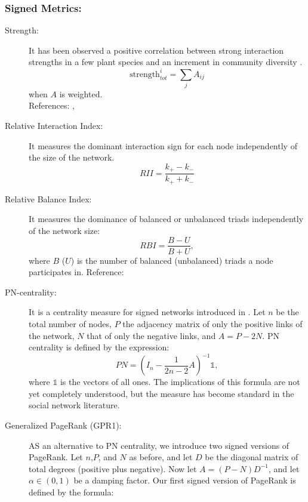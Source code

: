 \subsubsection{Signed Metrics:}
   \begin{description}
       
\item[Strength:] 
It has been observed a positive correlation between strong interaction strengths in a few plant species and an increment in community diversity \cite{melian2009diversity}.
\begin{equation}
       \textrm{strength}^{i}_{tot} = \sum_j A_{ij}
\end{equation}
 when $A$ is weighted.  \\
   References: \cite{Jordan2008IdentifyingNetworks},\cite{melian2009diversity}
\item[ Relative Interaction  Index:]  It measures the dominant interaction sign for each node independently of the size of the network.
\begin{equation}
    RII = \frac{k_+ - k_-}{k_+ + k_-} 
\end{equation}
\item[ Relative Balance  Index:] It measures the dominance of balanced or unbalanced triads independently of the network size:
\begin{equation}
     RBI = \frac{B - U}{B + U},
\end{equation}
where $B$ ($U$) is the number of balanced (unbalanced) triads a node participates in. 
Reference: \cite{harary1955local}
\item[PN-centrality:] It is a centrality measure for signed networks introduced in \cite{everett2014networks}. Let $n$ be the total number of nodes, $P$ the adjacency matrix of only the positive links of the network, $N$ that of only the negative links, and $A = P-2N$. PN centrality is defined by the expression:
\begin{equation}
    PN = \left(I_n - \frac{1}{2n-2}A\right)^{-1} \mathbb{1},
\end{equation}
where $\mathbb{1}$ is the vectors of all ones. The implications of this formula are not yet completely understood, but the measure has become standard in the social network literature.
\item[Generalized PageRank (GPR1):]  AS an alternative to PN centrality, we introduce two signed versions of PageRank. Let $n$,$P$, and $N$ as before, and let $D$ be the diagonal matrix of total degrees (positive plus negative). Now let $A = (P-N)D^{-1}$, and let $\alpha \in (0,1)$ be a damping factor. Our first signed version of PageRank is defined by the formula:

\end{description}
